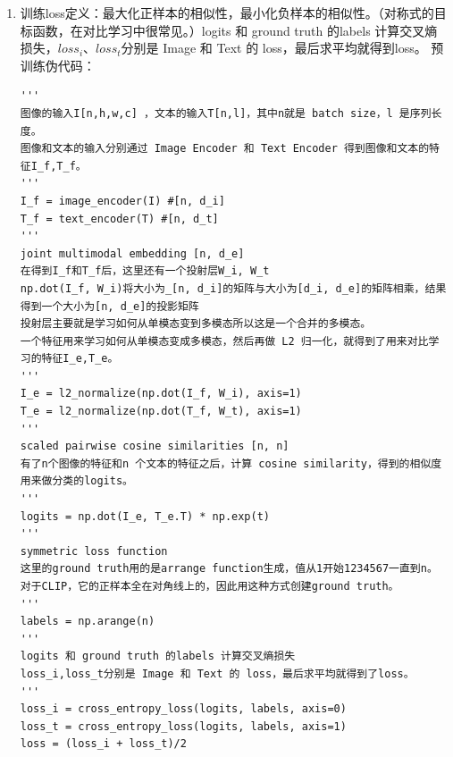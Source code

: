 \documentclass[zihao=false,fontset=windows]{ctexart}
\begin{document}
\begin{enumerate}
\begin{feishuquote}
余弦相似度的值范围在-1到1之间，值越接近1，表示两个向量越相似；值越接近-1，表示两个向量越不相似；值为0时，表示两个向量相互垂直（正交）。\par
余弦相似度广泛应用于文本匹配、数据挖掘、机器学习等领域，用于评估样本之间的相似性。\par
在某些情况下，它可以替代欧氏距离，因为余弦相似度不仅考虑了向量的长度，还考虑了方向。\par
\end{feishuquote}
\item 训练loss定义：最大化正样本的相似性，最小化负样本的相似性。（对称式的目标函数，在对比学习中很常见。）logits 和 ground truth 的labels 计算交叉熵损失，$loss_i$、$loss_t$分别是 Image 和 Text 的 loss，最后求平均就得到loss。
预训练伪代码：\par
\begin{feishucode}
\begin{lstlisting}[language=clipnp]
'''
图像的输入I[n,h,w,c] ，文本的输入T[n,l]，其中n就是 batch size，l 是序列长度。
图像和文本的输入分别通过 Image Encoder 和 Text Encoder 得到图像和文本的特征I_f,T_f。
'''
I_f = image_encoder(I) #[n, d_i]
T_f = text_encoder(T) #[n, d_t]
'''
joint multimodal embedding [n, d_e]
在得到I_f和T_f后，这里还有一个投射层W_i, W_t
np.dot(I_f, W_i)将大小为_[n, d_i]的矩阵与大小为[d_i, d_e]的矩阵相乘，结果得到一个大小为[n, d_e]的投影矩阵
投射层主要就是学习如何从单模态变到多模态所以这是一个合并的多模态。
一个特征用来学习如何从单模态变成多模态，然后再做 L2 归一化，就得到了用来对比学习的特征I_e,T_e。
'''
I_e = l2_normalize(np.dot(I_f, W_i), axis=1)
T_e = l2_normalize(np.dot(T_f, W_t), axis=1)
'''
scaled pairwise cosine similarities [n, n]
有了n个图像的特征和n 个文本的特征之后，计算 cosine similarity，得到的相似度用来做分类的logits。
'''
logits = np.dot(I_e, T_e.T) * np.exp(t)
'''
symmetric loss function
这里的ground truth用的是arrange function生成，值从1开始1234567一直到n。
对于CLIP，它的正样本全在对角线上的，因此用这种方式创建ground truth。
'''
labels = np.arange(n)
'''
logits 和 ground truth 的labels 计算交叉熵损失
loss_i,loss_t分别是 Image 和 Text 的 loss，最后求平均就得到了loss。
'''
loss_i = cross_entropy_loss(logits, labels, axis=0)
loss_t = cross_entropy_loss(logits, labels, axis=1)
loss = (loss_i + loss_t)/2
\end{lstlisting}
\end{feishucode}
\end{enumerate}
\par\vspace{0.75em}\par\vspace{0.28em}
\end{document}
